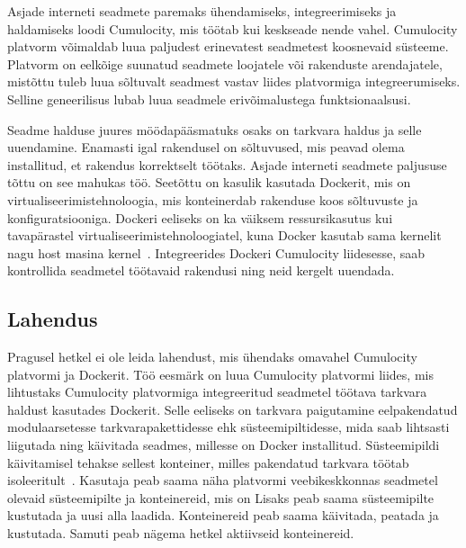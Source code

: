 \documentclass[12pt]{article}
\begin{document}
  Asjade interneti seadmete paremaks ühendamiseks, integreerimiseks ja haldamiseks loodi
  Cumulocity, mis töötab kui keskseade nende vahel. Cumulocity platvorm võimaldab luua
  paljudest erinevatest seadmetest koosnevaid süsteeme. Platvorm on eelkõige suunatud
  seadmete loojatele või rakenduste arendajatele, mistõttu tuleb luua sõltuvalt seadmest
  vastav liides platvormiga integreerumiseks. Selline geneerilisus lubab luua
  seadmele erivõimalustega funktsionaalsusi.

  Seadme halduse juures möödapääsmatuks osaks on tarkvara haldus ja selle uuendamine.
  Enamasti igal rakendusel on sõltuvused, mis peavad olema installitud, et rakendus
  korrektselt töötaks. Asjade interneti seadmete paljususe tõttu on see mahukas töö.
  Seetõttu on kasulik kasutada Dockerit, mis on virtualiseerimistehnoloogia, mis
  konteinerdab rakenduse koos sõltuvuste ja konfiguratsiooniga.
  Dockeri eeliseks on ka väiksem ressursikasutus kui tavapärastel
  virtualiseerimistehnoloogiatel, kuna Docker kasutab sama kernelit nagu host masina
  kernel~\cite{DockerDocOverview}.
  Integreerides
  Dockeri Cumulocity liidesesse, saab kontrollida seadmetel töötavaid rakendusi
  ning neid kergelt uuendada.
  






  \subsection{Lahendus}
  Pragusel hetkel ei ole leida lahendust, mis ühendaks omavahel Cumulocity platvormi
  ja Dockerit. Töö eesmärk on luua Cumulocity platvormi liides, mis lihtustaks Cumulocity platvormiga
  integreeritud seadmetel töötava tarkvara
  haldust kasutades Dockerit. Selle eeliseks on tarkvara paigutamine eelpakendatud
  modulaarsetesse tarkvarapakettidesse ehk süsteemipiltidesse, mida saab lihtsasti liigutada
  ning käivitada seadmes, millesse on Docker installitud. Süsteemipildi
  käivitamisel tehakse sellest konteiner, milles pakendatud tarkvara töötab
  isoleeritult~\cite{DockerDocOverview}.
  Kasutaja peab saama näha platvormi veebikeskkonnas seadmetel
  olevaid süsteemipilte ja konteinereid, mis on  Lisaks peab saama süsteemipilte kustutada ja uusi
  alla laadida. Konteinereid peab saama käivitada, peatada ja kustutada. Samuti peab nägema
  hetkel aktiivseid konteinereid.
\end{document}
